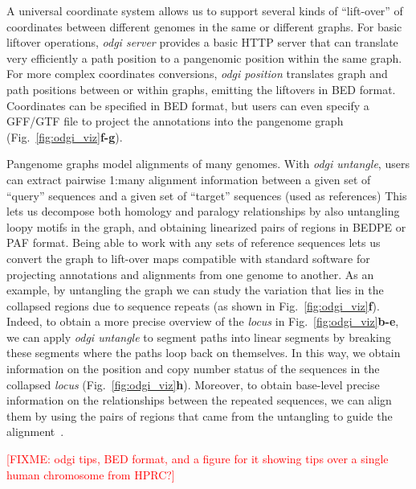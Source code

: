 \documentclass{bioinfo}
\newcommand{\red}[1]{{\textcolor{Red}{#1}}}
\newcommand{\FIXME}[1]{\red{[FIXME: #1]}}
\begin{document}
A universal coordinate system allows us to support several kinds of ``lift-over'' of coordinates between different genomes in the same or different graphs.
For basic liftover operations, \textit{odgi server} provides a basic HTTP server that can translate very efficiently a path position to a pangenomic position within the same graph.
For more complex coordinates conversions, \textit{odgi position} translates graph and path positions between or within graphs, emitting the liftovers in BED format.
Coordinates can be specified in BED format, but users can even specify a GFF/GTF file to project the annotations into the pangenome graph (Fig.~\ref{fig:odgi_viz}\textbf{f-g}).


Pangenome graphs model alignments of many genomes.
With \textit{odgi untangle}, users can extract pairwise 1:many alignment information between a given set of ``query'' sequences and a given set of ``target'' sequences (used as references)
This lets us decompose both homology and paralogy relationships by also untangling loopy motifs in the graph, and obtaining linearized pairs of regions in BEDPE or PAF format.
Being able to work with any sets of reference sequences lets us convert the graph to lift-over maps compatible with standard software for projecting annotations and alignments from one genome to another.
As an example, by untangling the graph we can study the variation that lies in the collapsed regions due to sequence repeats (as shown in Fig.~\ref{fig:odgi_viz}\textbf{f}).
Indeed, to obtain a more precise overview of the \textit{locus} in Fig.~\ref{fig:odgi_viz}\textbf{b-e},
we can apply \textit{odgi untangle} to segment paths into linear segments by breaking these segments where the paths loop back on themselves.
In this way, we obtain information on the position and copy number status of the sequences in the collapsed \textit{locus} (Fig.~\ref{fig:odgi_viz}\textbf{h}).
Moreover, to obtain base-level precise information on the relationships between the repeated sequences, we can align them by using the pairs of regions that came from the untangling to guide the alignment~\citep{wfmash}.

\FIXME{odgi tips, BED format, and a figure for it showing tips over a single human chromosome from HPRC?}
\end{document}
